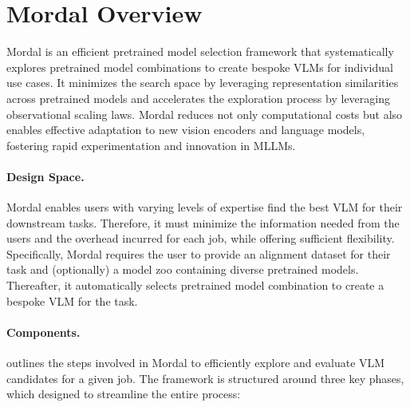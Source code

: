 


\section{Mordal Overview}
\label{sec:overview}


Mordal is an efficient pretrained model selection framework that systematically explores pretrained model combinations to create bespoke VLMs for individual use cases. 
It minimizes the search space by leveraging representation similarities across pretrained models and accelerates the exploration process by leveraging observational scaling laws.
Mordal reduces not only computational costs but also enables effective adaptation to new vision encoders and language models, fostering rapid experimentation and innovation in MLLMs.

\paragraph{Design Space.}
Mordal enables users with varying levels of expertise find the best VLM for their downstream tasks. 
Therefore, it must minimize the information needed from the users and the overhead incurred for each job, while offering sufficient flexibility. 
Specifically, Mordal requires the user to provide an alignment dataset for their task and (optionally) a model zoo containing diverse pretrained models.
Thereafter, it automatically selects pretrained model combination to create a bespoke VLM for the task.

\paragraph{Components.}

 outlines the steps involved in Mordal to efficiently explore and evaluate VLM candidates for a given job. 
The framework is structured around three key phases, which designed to streamline the entire process:

